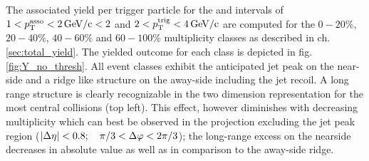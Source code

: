 The associated yield per trigger particle for the \ptassoc and \pttrig intervals of $ 1 < p_{\text{T}}^{\text{asso}} < \SI{2}{GeV/c} < 2$ and $ 2 < p_{\text{T}}^{\text{trig}} < \SI{4}{GeV/c}$ are computed for the $0-20\%$, $20-40\%$, $40-60\%$ and $60-100\%$ multiplicity classes as described in ch. \ref{sec:total_yield}. The yielded outcome for each class is depicted in fig. \ref{fig:Y_no_thresh}. All event classes exhibit the anticipated jet peak on the \gls{near-side} and a ridge like structure on the \gls{away-side} including the jet recoil. A long range \deta structure is clearly recognizable in the two dimension representation for the most central collisions (top left). This effect, however diminishes with decreasing multiplicity which can best be observed in the \dphi projection excluding the jet peak region ($|\Delta\eta| < 0.8;  \quad \pi /3 < \Delta\varphi < 2 \pi /3$); the long-range excess on the nearside decreases in absolute value as well as in comparison to the \gls{away-side} ridge.

